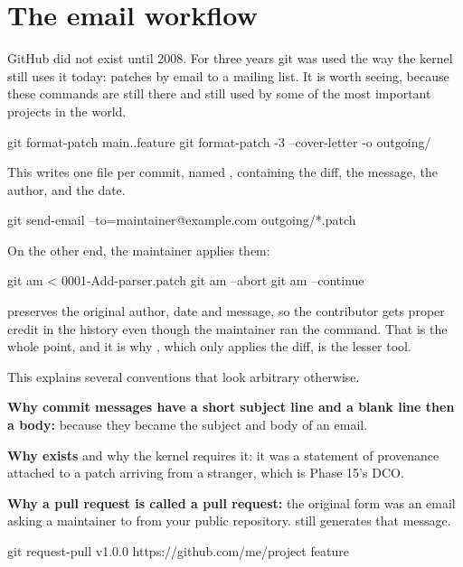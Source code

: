 \documentclass[11pt]{article}
\begin{document}
\section{The email workflow}

GitHub did not exist until 2008. For three years git was used the way the kernel
still uses it today: patches by email to a mailing list. It is worth seeing, because
these commands are still there and still used by some of the most important projects
in the world.

\begin{shell}
git format-patch main..feature
git format-patch -3 --cover-letter -o outgoing/
\end{shell}

This writes one file per commit, named , containing the
diff, the message, the author, and the date.

\begin{shell}
git send-email --to=maintainer@example.com outgoing/*.patch
\end{shell}

On the other end, the maintainer applies them:

\begin{shell}
git am < 0001-Add-parser.patch
git am --abort
git am --continue
\end{shell}

 preserves the original author, date and message, so the contributor gets
proper credit in the history even though the maintainer ran the command. That is the
whole point, and it is why , which only applies the diff, is the
lesser tool.

\begin{note}
This explains several conventions that look arbitrary otherwise.

\textbf{Why commit messages have a short subject line and a blank line then a body:}
because they became the subject and body of an email.

\textbf{Why  exists} and why the kernel requires it: it was a
statement of provenance attached to a patch arriving from a stranger, which is Phase
15's DCO.

\textbf{Why a pull request is called a pull request:} the original form was an email
asking a maintainer to  from your public repository.  still generates that message.
\end{note}

\begin{shell}
git request-pull v1.0.0 https://github.com/me/project feature
\end{shell}
\end{document}
